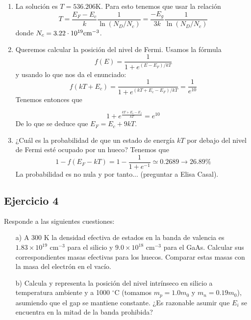 	\begin{enumerate}[label=\alph*)]
		\item La solución es $T=536.206$K. Para esto tenemos que usar la relación
		      \begin{equation}
			      T = \frac{E_F-E_c}{k} \frac{1}{\ln (N_D/N_c)} =  \frac{-E_g}{3k} \frac{1}{\ln (N_D/N_c)}
		      \end{equation}
		      donde $N_c=3.22\cdot 10^{19}\text{cm}^{-3}$.
		\item Queremos calcular la posición del nivel de Fermi. Usamos la fórmula
		      \begin{equation}
			      f(E) = \frac{1}{1+e^{(E-E_F)/kT}}
		      \end{equation}
		      y usando lo que nos da el enunciado:
		      \begin{equation}
			      f(kT+E_c) = \frac{1}{1+e^{(kT+E_c-E_F)/kT}}
			      = \frac{1}{e^{10}}
		      \end{equation}
		      Tenemos entonces que

		      \begin{equation}
			      1+e^{\frac{kT+E_c-E_f}{kT}} = e^{10}
		      \end{equation}
		      De lo que se deduce que $E_F = E_c + 9kT$.
		\item ¿Cuál es la probabilidad de que un estado de energía \( kT \) por debajo del nivel de Fermi esté ocupado por un hueco? Tenemos que
		      \begin{equation}
			      1-f(E_F-kT) = 1 - \frac{1}{1+e^{-1}} \simeq 0.2689 \rightarrow 26.89 \%
		      \end{equation}
		      La probabilidad es no nula y por tanto... (preguntar a Elisa Casal).
	\end{enumerate}

\begin{Enunciado}
\subsection*{Ejercicio 4}

Responde a las siguientes cuestiones:
\begin{enumerate}
	\item[a)] A 300 K la densidad efectiva de estados en la banda de valencia es $1.83 \times 10^{19} \text{ cm}^{-3}$ para el silicio y $9.0 \times 10^{18} \text{ cm}^{-3}$ para el GaAs. Calcular sus correspondientes masas efectivas para los huecos. Comparar estas masas con la masa del electrón en el vacío.

	\item[b)] Calcula y representa la posición del nivel intrínseco en silicio a temperatura ambiente y a 1000 $^{\circ}$C (tomamos $m_p = 1.0m_0$ y $m_n = 0.19m_0$), asumiendo que el gap se mantiene constante. ¿Es razonable asumir que $E_i$ se encuentra en la mitad de la banda prohibida?
\end{enumerate}
\end{Enunciado}

